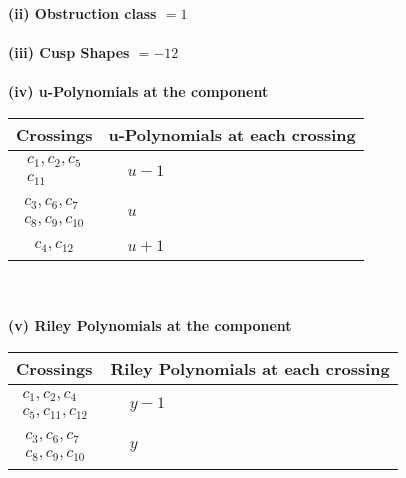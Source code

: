 \documentclass[1p]{elsarticle_modified}
\theoremstyle{definition}
\begin{document}
\flushleft \textbf{(ii) Obstruction class $= 1$}\\~\\
\flushleft \textbf{(iii) Cusp Shapes $= -12$}\\~\\
\newpage\renewcommand{\arraystretch}{1}
\flushleft \textbf{(iv) u-Polynomials at the component}\newline \\
\begin{tabular}{m{50pt}|m{274pt}}
Crossings & \hspace{64pt}u-Polynomials at each crossing \\
\hline $$\begin{aligned}c_{1},c_{2},c_{5}\\c_{11}\end{aligned}$$&$\begin{aligned}
&u-1
\end{aligned}$\\
\hline $$\begin{aligned}c_{3},c_{6},c_{7}\\c_{8},c_{9},c_{10}\end{aligned}$$&$\begin{aligned}
&u
\end{aligned}$\\
\hline $$\begin{aligned}c_{4},c_{12}\end{aligned}$$&$\begin{aligned}
&u+1
\end{aligned}$\\
\hline
\end{tabular}\\~\\
\newpage\renewcommand{\arraystretch}{1}
\flushleft \textbf{(v) Riley Polynomials at the component}\newline \\
\begin{tabular}{m{50pt}|m{274pt}}
Crossings & \hspace{64pt}Riley Polynomials at each crossing \\
\hline $$\begin{aligned}c_{1},c_{2},c_{4}\\c_{5},c_{11},c_{12}\end{aligned}$$&$\begin{aligned}
&y-1
\end{aligned}$\\
\hline $$\begin{aligned}c_{3},c_{6},c_{7}\\c_{8},c_{9},c_{10}\end{aligned}$$&$\begin{aligned}
&y
\end{aligned}$\\
\hline
\end{tabular}\\~\\
\end{document}
